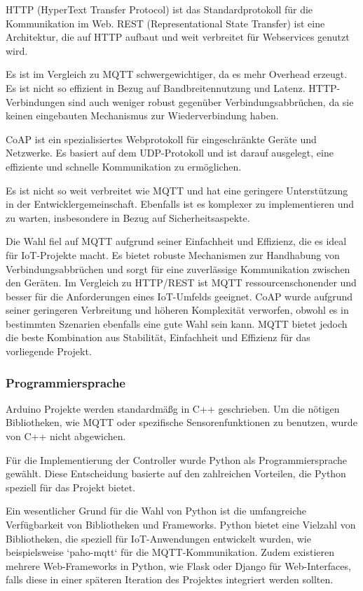 HTTP (HyperText Transfer Protocol) ist das Standardprotokoll für die Kommunikation im Web. REST (Representational State Transfer) ist eine Architektur, die auf HTTP aufbaut und weit verbreitet für Webservices genutzt wird.

Es ist im Vergleich zu MQTT schwergewichtiger, da es mehr Overhead erzeugt. Es ist nicht so effizient in Bezug auf Bandbreitennutzung und Latenz. HTTP-Verbindungen sind auch weniger robust gegenüber Verbindungsabbrüchen, da sie keinen eingebauten Mechanismus zur Wiederverbindung haben.

CoAP ist ein spezialisiertes Webprotokoll für eingeschränkte Geräte und Netzwerke. Es basiert auf dem UDP-Protokoll und ist darauf ausgelegt, eine effiziente und schnelle Kommunikation zu ermöglichen. 

Es ist nicht so weit verbreitet wie MQTT und hat eine geringere Unterstützung in der Entwicklergemeinschaft. Ebenfalls ist es komplexer zu implementieren und zu warten, insbesondere in Bezug auf Sicherheitsaspekte.

Die Wahl fiel auf MQTT aufgrund seiner Einfachheit und Effizienz, die es ideal für IoT-Projekte macht. Es bietet robuste Mechanismen zur Handhabung von Verbindungsabbrüchen und sorgt für eine zuverlässige Kommunikation zwischen den Geräten. Im Vergleich zu HTTP/REST ist MQTT ressourcenschonender und besser für die Anforderungen eines IoT-Umfelds geeignet. CoAP wurde aufgrund seiner geringeren Verbreitung und höheren Komplexität verworfen, obwohl es in bestimmten Szenarien ebenfalls eine gute Wahl sein kann. MQTT bietet jedoch die beste Kombination aus Stabilität, Einfachheit und Effizienz für das vorliegende Projekt.

\subsubsection{Programmiersprache}
Arduino Projekte werden standardmäßg in C++ geschrieben. Um die nötigen Bibliotheken, wie MQTT oder spezifische Sensorenfunktionen zu benutzen, wurde von C++ nicht abgewichen.

Für die Implementierung der Controller wurde Python als Programmiersprache gewählt. Diese Entscheidung basierte auf den zahlreichen Vorteilen, die Python speziell für das Projekt bietet.\cite{javatpoint2021iotpython}

Ein wesentlicher Grund für die Wahl von Python ist die umfangreiche Verfügbarkeit von Bibliotheken und Frameworks. Python bietet eine Vielzahl von Bibliotheken, die speziell für IoT-Anwendungen entwickelt wurden, wie beispielsweise `paho-mqtt` für die MQTT-Kommunikation. Zudem existieren mehrere Web-Frameworks in Python, wie Flask oder Django für Web-Interfaces, falls diese in einer späteren Iteration des Projektes integriert werden sollten.


